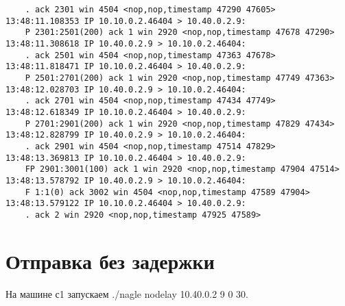 \documentclass[a4paper,12pt]{article}
\begin{document}
\begin{Verbatim}
    . ack 2301 win 4504 <nop,nop,timestamp 47290 47605>
13:48:11.108353 IP 10.10.0.2.46404 > 10.40.0.2.9: 
    P 2301:2501(200) ack 1 win 2920 <nop,nop,timestamp 47678 47290>
13:48:11.308618 IP 10.40.0.2.9 > 10.10.0.2.46404: 
    . ack 2501 win 4504 <nop,nop,timestamp 47363 47678>
13:48:11.818471 IP 10.10.0.2.46404 > 10.40.0.2.9: 
    P 2501:2701(200) ack 1 win 2920 <nop,nop,timestamp 47749 47363>
13:48:12.028703 IP 10.40.0.2.9 > 10.10.0.2.46404: 
    . ack 2701 win 4504 <nop,nop,timestamp 47434 47749>
13:48:12.618349 IP 10.10.0.2.46404 > 10.40.0.2.9: 
    P 2701:2901(200) ack 1 win 2920 <nop,nop,timestamp 47829 47434>
13:48:12.828799 IP 10.40.0.2.9 > 10.10.0.2.46404: 
    . ack 2901 win 4504 <nop,nop,timestamp 47514 47829>
13:48:13.369813 IP 10.10.0.2.46404 > 10.40.0.2.9: 
    FP 2901:3001(100) ack 1 win 2920 <nop,nop,timestamp 47904 47514>
13:48:13.578792 IP 10.40.0.2.9 > 10.10.0.2.46404: 
    F 1:1(0) ack 3002 win 4504 <nop,nop,timestamp 47589 47904>
13:48:13.579122 IP 10.10.0.2.46404 > 10.40.0.2.9: 
    . ack 2 win 2920 <nop,nop,timestamp 47925 47589>
\end{Verbatim}

\section{Отправка без задержки}


На машине с1 запускаем ./nagle nodelay 10.40.0.2 9 0 30.
\end{document}
